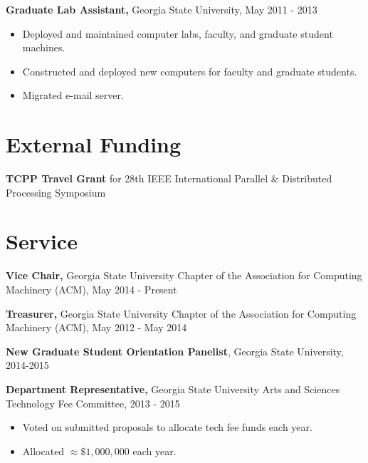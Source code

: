 \documentclass{res}
\begin{document}
\begin{resume}
\begin{itemize}
     \end{itemize}   
     
{\bf Graduate Lab Assistant,} Georgia State University, May 2011 - 2013
     \begin{itemize}
     \item Deployed and maintained computer labs, faculty, and graduate student machines.
     \item Constructed and deployed new computers for faculty and graduate students.
     \item Migrated e-mail server.
     \end{itemize}
     

\section{External Funding}
\textbf{TCPP Travel Grant} for 28th IEEE International Parallel \& Distributed Processing Symposium


\section{Service}


{\bf Vice Chair,} Georgia State University Chapter of the Association for Computing Machinery (ACM),  May 2014 - Present

{\bf Treasurer,} Georgia State University Chapter of the Association for Computing Machinery (ACM), May 2012 - May 2014

{\bf New Graduate Student Orientation Panelist}, Georgia State University, 2014-2015


{\bf Department Representative,} Georgia State University Arts and Sciences Technology Fee Committee, 2013 - 2015
\begin{itemize}
	\item Voted on submitted proposals to allocate tech fee funds each year.
	\item Allocated $\approx \$1,000,000$ each year.
\end{itemize}



\end{resume}
\end{document}
